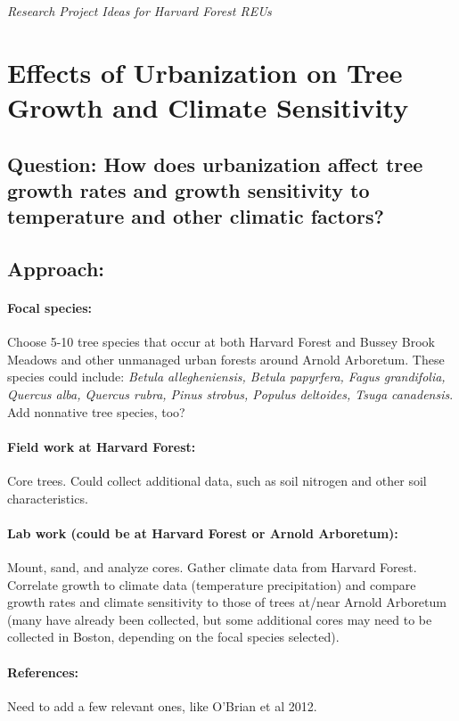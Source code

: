 \documentclass[11pt]{article}
\begin{document}
\noindent \emph{\LARGE Research Project Ideas for Harvard Forest REUs}

\section{Effects of Urbanization on Tree Growth and Climate Sensitivity}
\subsection{Question: How does urbanization affect tree growth rates and growth sensitivity to temperature and other climatic factors?}
\subsection{Approach:}
\paragraph {Focal species:} Choose 5-10 tree species that occur at both Harvard Forest and Bussey Brook Meadows and other unmanaged urban forests around Arnold Arboretum. These species could include: \emph{Betula allegheniensis, Betula papyrfera, Fagus grandifolia, Quercus alba, Quercus rubra, Pinus strobus, Populus deltoides, Tsuga canadensis}. Add nonnative tree species, too?
\paragraph {Field work at Harvard Forest:} Core trees. Could collect additional data, such as soil nitrogen and other soil characteristics. 
\paragraph {Lab work (could be at Harvard Forest or Arnold Arboretum):} Mount, sand, and analyze cores. Gather climate data from Harvard Forest. Correlate growth to climate data (temperature precipitation) and compare growth rates and climate sensitivity to those of trees at/near Arnold Arboretum (many have already been collected, but some additional cores may need to be collected in 
Boston, depending on the focal species selected).

\paragraph {References:} Need to add a few relevant ones, like O'Brian et al 2012.
\end{document}
